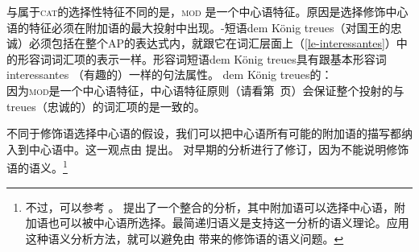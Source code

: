 与属于\textsc{cat}的选择性特征\subcatc 不同的是，\textsc{mod} 是一个中心语特征。原因是选择修饰中心语的特征必须在附加语的最大投射中出现。\nbarc{}-短语dem König treues（对国王的忠诚）必须包括在整个AP的表达式内，就跟它在词汇层面上（\ref{le-interessantes}）中的形容词词汇项的表示一样。形容词短语dem König treues具有跟基本形容词interessantes （有趣的）一样的句法属性。
\ea
\label{avm-dem-koenig-treues}
dem König treues的\catvc：\\
\z
因为\textsc{mod}是一个中心语特征，中心语特征原则（请看第~\pageref{prinzip-hfp}页）会保证整个投射的\modvc 与treues（忠诚的）的词汇项的\modvc 是一致的。

不同于修饰语选择中心语的假设，我们可以把中心语所有可能的附加语的描写都纳入到中心语中。这一观点由 \citet[]{ps}提出。 \citet[\S~1.9]{ps2}对早期的分析进行了修订，因为不能说明修饰语的语义。\footnote{%
不过，可以参考 。 提出了一个整合的分析，其中附加语可以选择中心语，附加语也可以被中心语所选择。最简递归语义是支持这一分析的语义理论\indexmrsc。应用这种语义分析方法，就可以避免由 \citet*{ps}带来的修饰语的语义问题。
}

